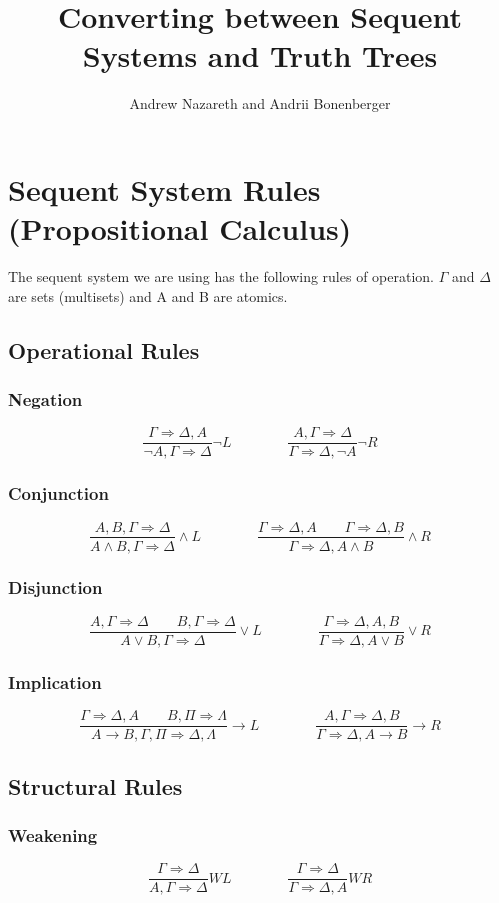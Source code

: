 \documentclass[12pt, letterpaper]{article}
\title{Converting between Sequent Systems and Truth Trees}
\author{Andrew Nazareth and Andrii Bonenberger}
\begin{document}
\maketitle
\pagebreak

\newcommand \sep \Rightarrow

\section*{Sequent System Rules (Propositional Calculus)}

The sequent system we are using has the following rules of operation. $\Gamma$ and $\Delta$ are sets (multisets) and A and B are atomics.
\subsection*{Operational Rules}
\subsubsection*{Negation}
\[
\frac{\Gamma \sep \Delta, A}{\neg A, \Gamma \sep \Delta} \neg L
\qquad \qquad
\frac{A, \Gamma \sep \Delta}{\Gamma \sep \Delta, \neg A} \neg R
\]
\subsubsection*{Conjunction}
\[
\frac{A, B, \Gamma \sep \Delta}{A \land B, \Gamma \sep \Delta} \land L
\qquad \qquad
\frac{\Gamma \sep \Delta, A \qquad \Gamma \sep \Delta, B}{\Gamma \sep \Delta, A \land B} \land R
\]
\subsubsection*{Disjunction}
\[
\frac{A, \Gamma \sep \Delta \qquad B, \Gamma \sep \Delta}{A \lor B, \Gamma \sep \Delta} \lor L
\qquad \qquad
\frac{\Gamma \sep \Delta, A, B}{\Gamma \sep \Delta, A \lor B} \lor R
\]
\subsubsection*{Implication}
\[
\frac{\Gamma \sep \Delta, A \qquad B, \Pi \sep \Lambda}{A \to B, \Gamma, \Pi \sep \Delta, \Lambda} \to L
\qquad \qquad
\frac{A, \Gamma \sep \Delta, B}{\Gamma \sep \Delta, A \to B} \to R
\]
\subsection*{Structural Rules}
\subsubsection*{Weakening}
\[
\frac{\Gamma \sep \Delta}{A, \Gamma \sep \Delta} WL
\qquad \qquad
\frac{\Gamma \sep \Delta}{\Gamma \sep \Delta, A} WR
\]
\end{document}
